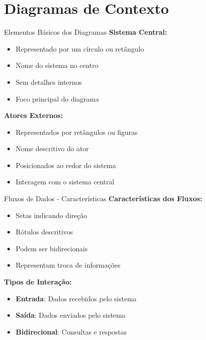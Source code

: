\documentclass[aspectratio=169]{beamer}
\begin{document}
\section{Diagramas de Contexto}

\begin{frame}{Elementos Básicos dos Diagramas}
\textbf{Sistema Central:}
\begin{itemize}
\item Representado por um círculo ou retângulo
\item Nome do sistema no centro
\item Sem detalhes internos
\item Foco principal do diagrama
\end{itemize}

\vspace{0.3cm}
\textbf{Atores Externos:}
\begin{itemize}
\item Representados por retângulos ou figuras
\item Nome descritivo do ator
\item Posicionados ao redor do sistema
\item Interagem com o sistema central
\end{itemize}
\end{frame}

\begin{frame}{Fluxos de Dados - Características}
\textbf{Características dos Fluxos:}
\begin{itemize}
\item Setas indicando direção
\item Rótulos descritivos
\item Podem ser bidirecionais
\item Representam troca de informações
\end{itemize}

\vspace{0.5cm}
\textbf{Tipos de Interação:}
\begin{itemize}
\item \textbf{Entrada}: Dados recebidos pelo sistema
\item \textbf{Saída}: Dados enviados pelo sistema
\item \textbf{Bidirecional}: Consultas e respostas
\end{itemize}
\end{frame}
\end{document}
